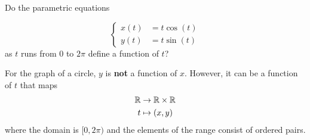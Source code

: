 \documentclass{ximera}
\begin{document}
\begin{question}
  Do the parametric equations

\[
\begin{cases}
x(t)&=t\cos(t) \\
y(t)&=t\sin(t)
\end{cases}
\]
  as $t$ runs from $0$ to $2\pi$ define a function of $t$?
  \begin{multipleChoice}
  \end{multipleChoice}
  \begin{feedback}
    For the graph of a circle, $y$ is \textbf{not} a function of
    $x$. However, it can be a function of $t$ that maps
    \begin{align*}
    \mathbb R &\to \mathbb R\times \mathbb R\\
    t &\mapsto (x,y)
    \end{align*}
    where the domain is $[0,2\pi)$ and the elements of the range
      consist of ordered pairs.
  \end{feedback}
\end{question}


%
\end{document}
